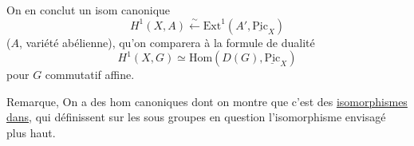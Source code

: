 On en conclut un isom canonique
\[
\boxed{H^1(X,A)\mathrel{\overset{\sim}{\longleftarrow}}\mathrm{Ext}^{1}(A',\underline{\mathrm{Pic}}_{X})}
\]
($A$, variété abélienne), qu'on comparera à la formule de dualité
\[
\boxed{H^1(X,G)\simeq\mathrm{Hom}(D(G),\underline{\mathrm{Pic}}_{X})}
\]
pour $G$ commutatif affine.

Remarque, On a des hom canoniques
dont on montre que c'est des \uline{isomorphismes dans}, qui définissent sur les sous groupes en question l'isomorphisme envisagé plus haut.

